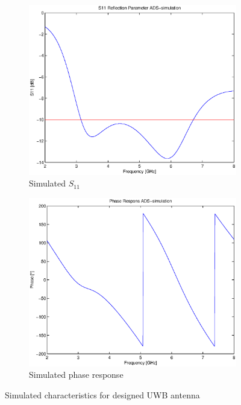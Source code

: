 \documentclass[a4paper]{article}        %
\begin{document}
		\begin{figure}[H]
		\begin{subfigure}{0.5\textwidth}
		\centering
			\includegraphics[width=\textwidth]{images/S11_ADS_sim.eps}
			\caption{Simulated $S_{11}$}
		\end{subfigure}
		\begin{subfigure}{0.5\textwidth}
		\centering
			\includegraphics[width=\textwidth]{images/fase_respons_ADS_sim.eps}
			\caption{Simulated phase response}
		\end{subfigure}
		\caption{Simulated characteristics for designed UWB antenna}
		\label{fig:S11_phase_design}
		\end{figure}
\end{document}
